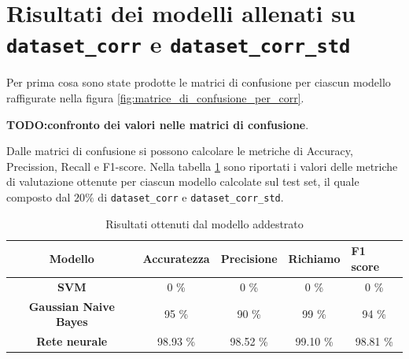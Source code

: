 \section{Risultati dei modelli allenati su \texttt{dataset\_corr} e \texttt{dataset\_corr\_std}} \label{sec:risultati_corr}
Per prima cosa sono state prodotte le matrici di confusione per ciascun modello
raffigurate nella figura \ref{fig:matrice_di_confusione_per_corr}.

\textbf{TODO:confronto dei valori nelle matrici di confusione}.

Dalle matrici di confusione si possono calcolare le metriche di Accuracy, Precission, 
Recall e F1-score. Nella tabella \ref{tab:risultati} sono riportati i valori delle 
metriche di valutazione ottenute per ciascun modello calcolate sul test set, il quale
composto dal $20\%$ di \texttt{dataset\_corr} e \texttt{dataset\_corr\_std}.
\begin{table}[!ht]
    \centering
    \begin{tabular}{@{}cllll@{}}
        \toprule
        \rowcolor[HTML]{EFEFEF}
        \textbf{Modello}                                      & \textbf{Accuratezza}         & \textbf{Precisione}          & \textbf{Richiamo}            & \textbf{F1 score}            \\ \midrule
        \cellcolor[HTML]{EFEFEF}\textbf{SVM}                  & \multicolumn{1}{c}{0 \%}     & \multicolumn{1}{c}{0 \%}     & \multicolumn{1}{c}{0 \%}     & \multicolumn{1}{c}{0 \%}     \\
        \cellcolor[HTML]{EFEFEF}\textbf{Gaussian Naive Bayes} & \multicolumn{1}{c}{95 \%}    & \multicolumn{1}{c}{90 \%}    & \multicolumn{1}{c}{99 \%}    & \multicolumn{1}{c}{94 \%}    \\
        \cellcolor[HTML]{EFEFEF}\textbf{Rete neurale}         & \multicolumn{1}{c}{98.93 \%} & \multicolumn{1}{c}{98.52 \%} & \multicolumn{1}{c}{99.10 \%} & \multicolumn{1}{c}{98.81 \%} \\ \bottomrule
    \end{tabular}
    \caption{Risultati ottenuti dal modello addestrato}
    \label{tab:risultati}
\end{table}

